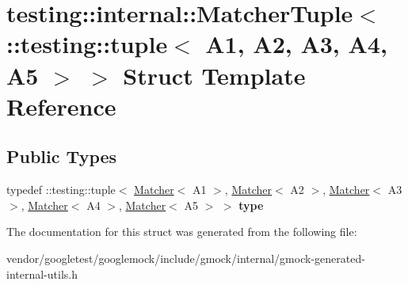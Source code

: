 \hypertarget{structtesting_1_1internal_1_1MatcherTuple_3_01_1_1testing_1_1tuple_3_01A1_00_01A2_00_01A3_00_01A4_00_01A5_01_4_01_4}{}\section{testing\+:\+:internal\+:\+:Matcher\+Tuple$<$ \+:\+:testing\+:\+:tuple$<$ A1, A2, A3, A4, A5 $>$ $>$ Struct Template Reference}
\label{structtesting_1_1internal_1_1MatcherTuple_3_01_1_1testing_1_1tuple_3_01A1_00_01A2_00_01A3_00_01A4_00_01A5_01_4_01_4}
\subsection*{Public Types}
\begin{DoxyCompactItemize}
\item 
typedef \+::testing\+::tuple$<$ \hyperlink{classtesting_1_1Matcher}{Matcher}$<$ A1 $>$, \hyperlink{classtesting_1_1Matcher}{Matcher}$<$ A2 $>$, \hyperlink{classtesting_1_1Matcher}{Matcher}$<$ A3 $>$, \hyperlink{classtesting_1_1Matcher}{Matcher}$<$ A4 $>$, \hyperlink{classtesting_1_1Matcher}{Matcher}$<$ A5 $>$ $>$ {\bfseries type}\hypertarget{structtesting_1_1internal_1_1MatcherTuple_3_01_1_1testing_1_1tuple_3_01A1_00_01A2_00_01A3_00_01A4_00_01A5_01_4_01_4_a3c6f888e9aee4d15d4b5821eeff658d4}{}\label{structtesting_1_1internal_1_1MatcherTuple_3_01_1_1testing_1_1tuple_3_01A1_00_01A2_00_01A3_00_01A4_00_01A5_01_4_01_4_a3c6f888e9aee4d15d4b5821eeff658d4}

\end{DoxyCompactItemize}


The documentation for this struct was generated from the following file\+:\begin{DoxyCompactItemize}
\item 
vendor/googletest/googlemock/include/gmock/internal/gmock-\/generated-\/internal-\/utils.\+h\end{DoxyCompactItemize}
